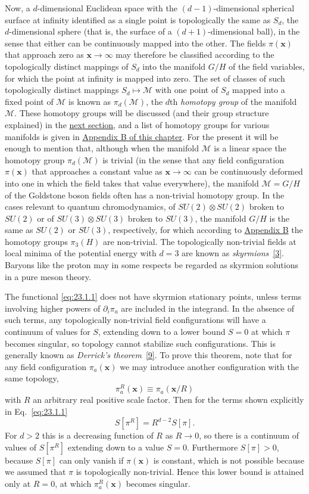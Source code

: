 Now, a $d$-dimensional Euclidean space with the $(d-1)$-dimensional
spherical surface at infinity identified as a single point is topologically
the same as $S_d$, the $d$-dimensional sphere (that is, the surface of a
$(d+1)$-dimensional ball), in the sense that either can be continuously
mapped into the other. The fields $\pi(\mathbf{x})$ that approach zero as
$\mathbf{x}\to\infty$ may therefore be classified according to the
topologically distinct mappings of $S_d$ into the manifold $G/H$ of the
field variables, for which the point at infinity is mapped into zero. The
set of classes of such topologically distinct mappings
$S_d\mapsto\mathcal M$ with one point of $S_d$ mapped into a fixed point of
$\mathcal M$ is known as $\pi_d(\mathcal M)$, the $d$th \emph{homotopy
group} of the manifold $\mathcal M$. These homotopy groups will be
discussed (and their group structure explained) in the
\hyperref[sec:23.2]{next section}, and a list of homotopy groups for various
manifolds is given in \hyperref[app:23.B]{Appendix B of this chapter}. For
the present it will be enough to mention that, although when the manifold
$\mathcal M$ is a linear space the homotopy group $\pi_d(\mathcal M)$ is
trivial (in the sense that any field configuration $\pi(\mathbf{x})$ that
approaches a constant value as $\mathbf{x}\to\infty$ can be continuously
deformed into one in which the field takes that value everywhere), the
manifold $\mathcal M=G/H$ of the Goldstone boson fields often has a
non-trivial homotopy group. In the cases relevant to quantum
chromodynamics, of $SU(2)\otimes SU(2)$ broken to $SU(2)$ or of
$SU(3)\otimes SU(3)$ broken to $SU(3)$, the manifold $G/H$ is the same as
$SU(2)$ or $SU(3)$, respectively, for which according to
\hyperref[app:23.B]{Appendix B} the
homotopy groups $\pi_3(H)$ are non-trivial. The topologically non-trivial
fields at local minima of the potential energy with $d=3$ are known as
\emph{skyrmions}~\hyperref[ch23-ref-3]{[3]}. Baryons like the proton may in some
respects be regarded as skyrmion solutions in a pure meson theory.

The functional \eqref{eq:23.1.1} does not have skyrmion stationary points,
unless terms involving higher powers of $\partial_i\pi_a$ are included in
the integrand. In the absence of such terms, any topologically non-trivial
field configurations will have a continuum of values for $S$, extending
down to a lower bound $S=0$ at which $\pi$ becomes singular, so topology
cannot stabilize such configurations. This is generally known as
\emph{Derrick's theorem}~\hyperref[ch23-ref-9]{[9]}. To prove this theorem, note
that for any field configuration $\pi_a(\mathbf{x})$ we may introduce
another configuration with the same topology,
\[
 \pi_a^R(\mathbf{x})\equiv\pi_a(\mathbf{x}/R)
\]
with $R$ an arbitrary real positive scale factor. Then for the terms shown
explicitly in Eq.~\eqref{eq:23.1.1}
\[
 S[\pi^R]=R^{d-2}S[\pi].
\]
For $d>2$ this is a decreasing function of $R$ as $R\to0$, so there is a
continuum of values of $S[\pi^R]$ extending down to a value $S=0$.
Furthermore $S[\pi]>0$, because $S[\pi]$ can only vanish if
$\pi(\mathbf{x})$ is constant, which is not possible because we assumed
that $\pi$ is topologically non-trivial. Hence this lower bound is attained
only at $R=0$, at which $\pi_a^R(\mathbf{x})$ becomes singular.

